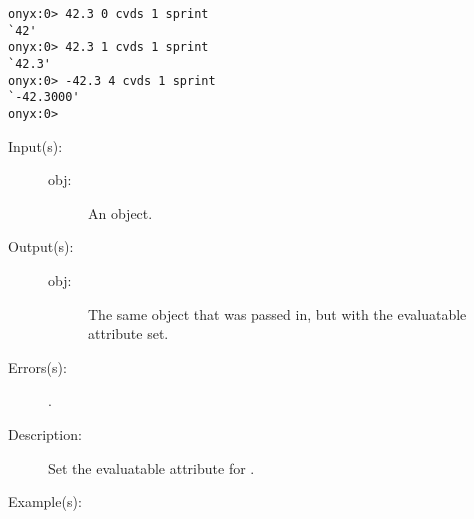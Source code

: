 \begin{description}
\begin{description}
\begin{verbatim}
onyx:0> 42.3 0 cvds 1 sprint
`42'
onyx:0> 42.3 1 cvds 1 sprint
`42.3'
onyx:0> -42.3 4 cvds 1 sprint
`-42.3000'
onyx:0>
		\end{verbatim}
	\end{description}
\label{systemdict:cve}
\item[{\onyxop{obj}{cve}{obj}}: ]
	\begin{description}\item[]
	\item[Input(s): ]
		\begin{description}\item[]
		\item[obj: ]
			An object.
		\end{description}
	\item[Output(s): ]
		\begin{description}\item[]
		\item[obj: ]
			The same object that was passed in, but with the
			evaluatable attribute set.
		\end{description}
	\item[Errors(s): ]
		\begin{description}\item[]
		\item[.]
		\end{description}
	\item[Description: ]
		Set the evaluatable attribute for .
	\item[Example(s): ]\begin{verbatim}


\end{verbatim}
\end{description}
\end{description}
